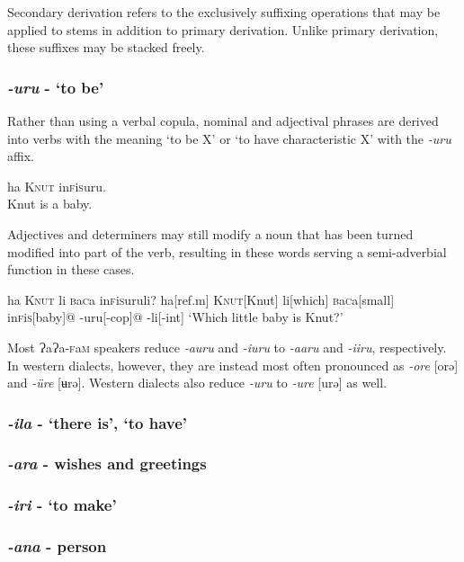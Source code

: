 \documentclass[a4paper,10pt,twoside,openright]{memoir}
\newcommand{\lang}{{\bigglot}a{\bigglot}a-\textsc{f}a\textsc{m}}
\newcommand{\bripa}[1]{[#1]}
\newcommand{\bigglot}{Ɂ}
\newcommand{\famwordold}[5]{#1\textsc{#2}#3\textsc{#4}#5}
\begin{document}
Secondary derivation refers to the exclusively suffixing operations that may be applied to stems in addition to primary derivation. Unlike primary derivation, these suffixes may be stacked freely. 

\subsubsection{\emph{-uru} - `to be'}

Rather than using a verbal copula, nominal and adjectival phrases are derived into verbs with the meaning `to be X' or `to have characteristic X' with the \emph{-uru} affix. 

\ex
ha \textsc{Knut} \famwordold{in}{f}{i}{s}{uru}.\\
Knut is a baby.
\xe

Adjectives and determiners may still modify a noun that has been turned modified into part of the verb, resulting in these words serving a semi-adverbial function in these cases. 

\ex
\begingl
\glpreamble
ha \textsc{Knut} li \famwordold{}{b}{a}{c}{a} \famwordold{in}{f}{i}{s}{uruli}?
\endpreamble
ha[\sc ref.m]
\textsc{Knut}[Knut]
li[which]
\famwordold{}{b}{a}{c}{a}[small]
\famwordold{in}{f}{i}{s}{}[baby]@
-uru[\sc -cop]@
-li[\sc -int]
\glft
`Which little baby is Knut?'
\endgl
\xe

Most \lang{} speakers reduce \textit{-auru} and \textit{-iuru} to \textit{-aaru} and \textit{-iiru}, respectively. In western dialects, however, they are instead most often pronounced as \textit{-ore} \bripa{orə} and \textit{-üre} \bripa{ʉrə}. Western dialects also reduce \textit{-uru} to \textit{-ure} \bripa{urə} as well.

\subsubsection{\emph{-ila} - `there is', `to have'}

\subsubsection{\emph{-ara} - wishes and greetings}

\subsubsection{\emph{-iri} - `to make'}

\subsubsection{\emph{-ana} - person}
\end{document}
